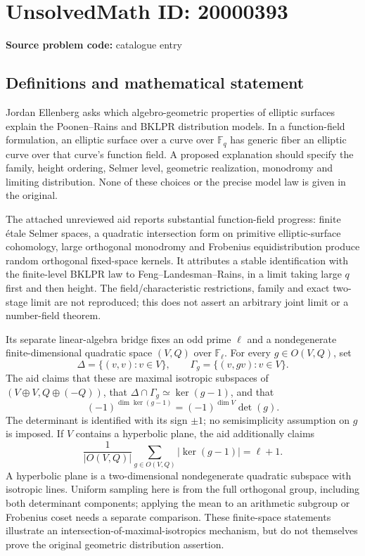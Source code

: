 \documentclass[11pt]{article}
\newcommand{\F}{\mathbb{F}}
\begin{document}
\section*{UnsolvedMath ID: 20000393}
\textbf{Source problem code:} catalogue entry
\subsection{Definitions and mathematical statement}
Jordan Ellenberg asks which algebro-geometric properties of elliptic surfaces explain the Poonen--Rains and BKLPR distribution models. In a function-field formulation, an elliptic surface over a curve over $\F_q$ has generic fiber an elliptic curve over that curve's function field. A proposed explanation should specify the family, height ordering, Selmer level, geometric realization, monodromy and limiting distribution. None of these choices or the precise model law is given in the original.

The attached unreviewed aid reports substantial function-field progress: finite \'etale Selmer spaces, a quadratic intersection form on primitive elliptic-surface cohomology, large orthogonal monodromy and Frobenius equidistribution produce random orthogonal fixed-space kernels. It attributes a stable identification with the finite-level BKLPR law to Feng--Landesman--Rains, in a limit taking large $q$ first and then height. The field/characteristic restrictions, family and exact two-stage limit are not reproduced; this does not assert an arbitrary joint limit or a number-field theorem.

Its separate linear-algebra bridge fixes an odd prime $\ell$ and a nondegenerate finite-dimensional quadratic space $(V,Q)$ over $\F_\ell$. For every $g\in O(V,Q)$, set
\[
\Delta=\{(v,v):v\in V\},\qquad\Gamma_g=\{(v,gv):v\in V\}.
\]
The aid claims that these are maximal isotropic subspaces of $(V\oplus V,Q\oplus(-Q))$, that $\Delta\cap\Gamma_g\simeq\ker(g-1)$, and that
\[
(-1)^{\dim\ker(g-1)}=(-1)^{\dim V}\det(g).
\]
The determinant is identified with its sign $\pm1$; no semisimplicity assumption on $g$ is imposed. If $V$ contains a hyperbolic plane, the aid additionally claims
\[
\frac1{|O(V,Q)|}\sum_{g\in O(V,Q)}|\ker(g-1)|=\ell+1.
\]
A hyperbolic plane is a two-dimensional nondegenerate quadratic subspace with isotropic lines. Uniform sampling here is from the full orthogonal group, including both determinant components; applying the mean to an arithmetic subgroup or Frobenius coset needs a separate comparison. These finite-space statements illustrate an intersection-of-maximal-isotropics mechanism, but do not themselves prove the original geometric distribution assertion.
\end{document}
